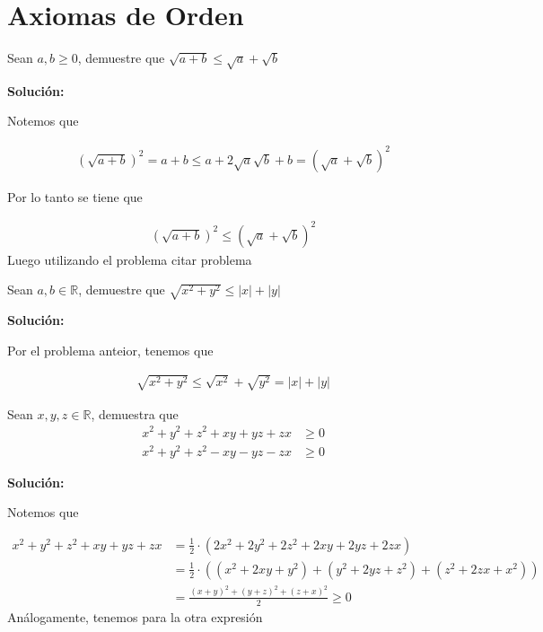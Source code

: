 \documentclass[12pt]{book}
\begin{document}
\chapter{Axiomas de Orden}



\begin{prob}{}{}
   Sean $a,b \geq 0 $, demuestre que $\sqrt{a+b}\leq \sqrt{a}+\sqrt{b}$
\end{prob}
\textbf{Solución:}

Notemos que 

\begin{align*}
    \left(\sqrt{a+b}\right)^2=a+b \leq a +2 \sqrt{a}\sqrt{b}+b = \left(\sqrt{a}+\sqrt{b}\right)^2
\end{align*}

Por lo tanto se tiene que 

\begin{align*}
     \left(\sqrt{a+b}\right)^2 \leq \left(\sqrt{a}+\sqrt{b}\right)^2
\end{align*}
Luego utilizando el problema {\Large citar problema}

\begin{prob}{}{}
    Sean $a,b \in \mathbb{R}$, demuestre que $\sqrt{x^2+y^2}\leq |x|+|y|$
\end{prob}
\textbf{Solución:}

Por el problema anteior, tenemos que 

\begin{align*}
    \sqrt{x^2+y^2}\leq \sqrt{x^2}+\sqrt{y^2}=|x|+|y|
\end{align*}

\begin{prob}{}{}
Sean $x,y,z \in \mathbb{R}$, demuestra que 
\begin{align*}
    x^2+y^2+z^2+xy+yz+zx &\geq 0 \\
    x^2+y^2+z^2-xy-yz-zx &\geq 0 
\end{align*}
\end{prob}
\textbf{Solución:}

Notemos que 

\begin{align}
    x^2+y^2+z^2+xy+yz+zx&= \frac{1}{2}\cdot ( 2x^2+2y^2+2z^2+2xy+2yz+2zx) \\
    &=\frac{1}{2}\cdot ((x^2+2xy+y^2)+(y^2+2yz+z^2)+(z^2+2zx+x^2)) \\
    &=\frac{(x+y)^2+(y+z)^2+(z+x)^2}{2} \geq 0
\end{align}
Análogamente, tenemos para la otra expresión
\end{document}
